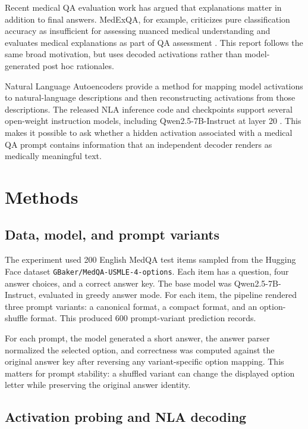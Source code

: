\documentclass{article}
\begin{document}
Recent medical QA evaluation work has argued that explanations matter in addition to final answers. MedExQA, for example, criticizes pure classification accuracy as insufficient for assessing nuanced medical understanding and evaluates medical explanations as part of QA assessment \citep{kim2024medexqa}. This report follows the same broad motivation, but uses decoded activations rather than model-generated post hoc rationales.

Natural Language Autoencoders provide a method for mapping model activations to natural-language descriptions and then reconstructing activations from those descriptions. The released NLA inference code and checkpoints support several open-weight instruction models, including Qwen2.5-7B-Instruct at layer 20 \citep{anthropic2026nla, kitft2026nla}. This makes it possible to ask whether a hidden activation associated with a medical QA prompt contains information that an independent decoder renders as medically meaningful text.

\section{Methods}

\subsection{Data, model, and prompt variants}

The experiment used 200 English MedQA test items sampled from the Hugging Face dataset \texttt{GBaker/MedQA-USMLE-4-options}. Each item has a question, four answer choices, and a correct answer key. The base model was Qwen2.5-7B-Instruct, evaluated in greedy answer mode. For each item, the pipeline rendered three prompt variants: a canonical format, a compact format, and an option-shuffle format. This produced 600 prompt-variant prediction records.

For each prompt, the model generated a short answer, the answer parser normalized the selected option, and correctness was computed against the original answer key after reversing any variant-specific option mapping. This matters for prompt stability: a shuffled variant can change the displayed option letter while preserving the original answer identity.

\subsection{Activation probing and NLA decoding}
\end{document}
